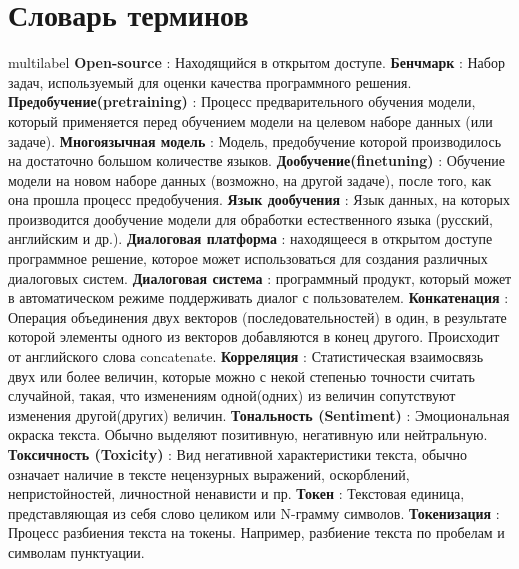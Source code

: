 \chapter*{Словарь терминов}             %
 multilabel  %
\textbf{Open-source} : Находящийся в открытом доступе. 
\textbf{Бенчмарк} : Набор задач, используемый для оценки качества программного решения. 
\textbf{Предобучение(pretraining)} : Процесс предварительного обучения модели, который
применяется перед обучением модели на целевом наборе данных (или задаче). 
\textbf{Многоязычная модель} : Модель, предобучение которой производилось на достаточно большом количестве языков. 
\textbf{Дообучение(finetuning)} : Обучение модели на новом наборе данных (возможно, на другой задаче), после того, как она прошла процесс предобучения.
\textbf{Язык дообучения} : Язык данных, на которых производится дообучение модели для обработки естественного языка (русский, английским и др.).
\textbf{Диалоговая платформа} : находящееся в открытом доступе программное решение, которое может использоваться для создания различных диалоговых систем.
\textbf{Диалоговая система} : программный продукт, который может в автоматическом режиме поддерживать диалог с пользователем.
\textbf{Конкатенация} : Операция объединения двух векторов (последовательностей) в один, в результате которой элементы одного из векторов добавляются в конец другого. Происходит от английского слова concatenate.
\textbf{Корреляция} : Статистическая взаимосвязь двух или более величин, которые можно с некой степенью точности считать случайной, такая, что изменениям одной(одних) из величин сопутствуют изменения другой(других) величин. 
\textbf{Тональность (Sentiment)} : Эмоциональная окраска текста. Обычно выделяют позитивную, негативную или нейтральную.
\textbf{Токсичность (Toxicity)} : Вид негативной характеристики текста, обычно означает наличие в тексте нецензурных выражений, оскорблений, непристойностей, личностной ненависти и пр.
\textbf{Токен} : Текстовая единица, представляющая из себя слово целиком или N-грамму символов.
\textbf{Токенизация} : Процесс разбиения текста на токены. Например, разбиение текста по пробелам и символам пунктуации. 
